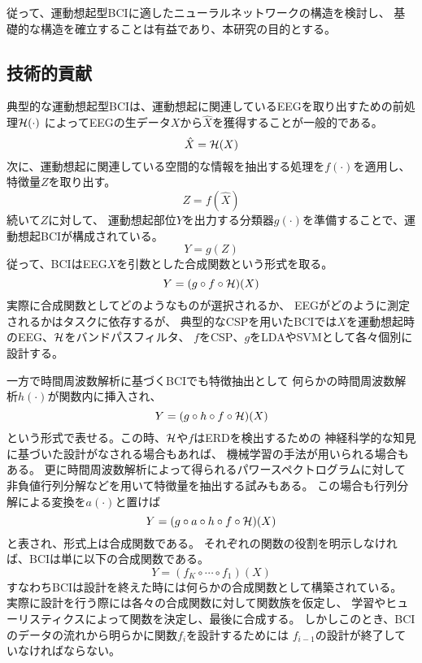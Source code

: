 従って、運動想起型BCIに適したニューラルネットワークの構造を検討し、
基礎的な構造を確立することは有益であり、本研究の目的とする。

\subsection{\mc 技術的貢献}
典型的な運動想起型BCIは、運動想起に関連しているEEGを取り出すための前処理\(\cal H(\cdot)\)
によってEEGの生データ\(X\)から\(\hat X\)を獲得することが一般的である。
\begin{equation}
    \hat X = {\cal H}(X)
    \label{eq:bandpass}
\end{equation}
次に、運動想起に関連している空間的な情報を抽出する処理を\(f(\cdot)\)を適用し、
特徴量\(Z\)を取り出す。
\begin{equation}
    Z = f(\hat X)
    \label{eq:spatfilter}
\end{equation}
続いて\(Z\)に対して、
運動想起部位\(Y\)を出力する分類器\(g(\cdot)\)を準備することで、運動想起BCIが構成されている。
\begin{equation}
    Y = g(Z)
    \label{eq:classifier}
\end{equation}
従って、BCIはEEG\(X\)を引数とした合成関数という形式を取る。
\begin{equation}
    Y = (g\circ f \circ {\cal H})(X)
    \label{eq:bci_gosei}
\end{equation}
実際に合成関数としてどのようなものが選択されるか、
EEGがどのように測定されるかはタスクに依存するが、
典型的なCSPを用いたBCIでは\(X\)を運動想起時のEEG、\(\cal H\)をバンドパスフィルタ、
\(f\)をCSP、\(g\)をLDAやSVMとして各々個別に設計する。

一方で時間周波数解析に基づくBCIでも特徴抽出として
何らかの時間周波数解析\(h(\cdot)\)が関数内に挿入され、
\begin{equation}
    Y = (g\circ h \circ f \circ {\cal H})(X)
    \label{eq:bci_gosei2}
\end{equation}
という形式で表せる。この時、\(\cal H\)や\(f\)はERDを検出するための
神経科学的な知見に基づいた設計がなされる場合もあれば、
機械学習の手法が用いられる場合もある。
更に時間周波数解析によって得られるパワースペクトログラムに対して
非負値行列分解などを用いて特徴量を抽出する試みもある\cite{kNMF,kNMF2}。
この場合も行列分解による変換を\(a(\cdot)\)と置けば
\begin{equation}
    Y = (g\circ a\circ h\circ f\circ {\cal H})(X)
    \label{eq:bci_gosei3}
\end{equation}
と表され、形式上は合成関数である。
それぞれの関数の役割を明示しなければ、BCIは単に以下の合成関数である。
\begin{equation}
    Y = (f_K\circ \cdots \circ f_1)(X)
    \label{eq:bci_gosei4}
\end{equation}
すなわちBCIは設計を終えた時には何らかの合成関数として構築されている。
実際に設計を行う際には各々の合成関数に対して関数族を仮定し、
学習やヒューリスティクスによって関数を決定し、最後に合成する。
しかしこのとき、BCIのデータの流れから明らかに関数\(f_i\)を設計するためには
\(f_{i-1}\)の設計が終了していなければならない。


